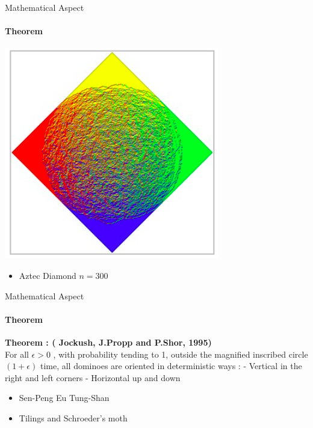 \documentclass [xcolor=svgnames, t] {beamer}
\begin{document}
 \begin{frame}{Mathematical Aspect}
 \framesubtitle{Theorem}
 \begin{itemize}
    \begin{center}
\includegraphics[scale=0.45]{A1.png}
\end{center}
 \end{itemize}
 \begin{itemize}
      \item Aztec Diamond $n = 300$
       
     
 \end{itemize}

 
 \end{frame}
 
 
\begin{frame}{Mathematical Aspect}
 \framesubtitle{Theorem}

\textbf{Theorem : ( Jockush, J.Propp and P.Shor, 1995)}\\

For all  $\epsilon > 0 $ , with probability tending to 1, outside the magnified inscribed circle $(1 + \epsilon)$ time, all dominoes are oriented in deterministic ways :
- Vertical in the right and left corners
- Horizontal up and down
\vspace{0.5cm}
\begin{itemize}
      \item Sen-Peng Eu Tung-Shan 
        \item Tilings and Schroeder's moth
       
     
 \end{itemize}
   
 \end{frame}
 
\end{document}
